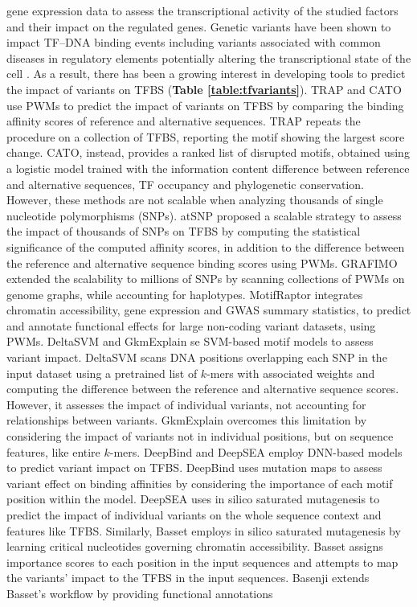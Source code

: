 \documentclass[a4paper, titlepage, openright]{book}
\newcommand{\grafimo}{GRAFIMO\xspace}
\newcommand{\motifraptor}{MotifRaptor\xspace}
\begin{document}
gene expression data to assess the transcriptional activity of the studied factors and their impact on the regulated genes. Genetic variants have been shown to impact TF–DNA binding events \citep{de2006regulatory, wienert2015editing, weinhold2014genome} including variants associated with common diseases in regulatory elements \citep{maurano2012systematic} potentially altering the transcriptional state of the cell \citep{deplancke2016genetics}. As a result, there has been a growing interest in developing tools to predict the impact of variants on TFBS (\textbf{Table \ref{table:tfvariants}}). TRAP \citep{thomas2011transcription} and CATO \citep{maurano2015large} use PWMs to predict the impact of variants on TFBS by comparing the binding affinity scores of reference and alternative sequences. TRAP repeats the procedure on a collection of TFBS, reporting the motif showing the largest score change. CATO, instead, provides a ranked list of disrupted motifs, obtained using a logistic model trained with the information content difference between reference and alternative sequences, TF occupancy and phylogenetic conservation. However, these methods are not scalable when analyzing thousands of single nucleotide polymorphisms (SNPs). atSNP \citep{zuo2015atsnp} proposed a scalable strategy to assess the impact of thousands of SNPs on TFBS by computing the statistical significance of the computed affinity scores, in addition to the difference between the reference and alternative sequence binding scores using PWMs. \grafimo \citep{tognon2021grafimo} extended the scalability to millions of SNPs by scanning collections of PWMs on genome graphs, while accounting for haplotypes. \motifraptor \citep{yao2021motif} integrates chromatin accessibility, gene expression and GWAS summary statistics, to predict and annotate functional effects for large non-coding variant datasets, using PWMs. DeltaSVM \citep{lee2015method} and GkmExplain \citep{shrikumar2019gkmexplain} se SVM-based motif models to assess variant impact. DeltaSVM scans DNA positions overlapping each SNP in the input dataset using a pretrained list of $k$-mers with associated weights and computing the difference between the reference and alternative sequence scores. However, it assesses the impact of individual variants, not accounting for relationships between variants. GkmExplain overcomes this limitation by considering the impact of variants not in individual positions, but on sequence features, like entire $k$-mers. DeepBind \citep{alipanahi2015predicting} and DeepSEA \citep{zhou2015predicting}  employ DNN-based models to predict variant impact on TFBS. DeepBind uses mutation maps to assess variant effect on binding affinities by considering the importance of each motif position within the model. DeepSEA uses in silico saturated mutagenesis to predict the impact of individual variants on the whole sequence context and features like TFBS. Similarly, Basset \citep{kelley2016basset} employs in silico saturated mutagenesis by learning critical nucleotides governing chromatin accessibility. Basset assigns importance scores to each position in the input sequences and attempts to map the variants’ impact to the TFBS in the input sequences. Basenji  \citep{kelley2018sequential} extends Basset’s workflow by providing functional annotations 
\end{document}
